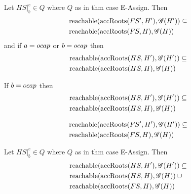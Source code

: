 \begin{proposition}
  Let $HS|_b^e \in Q$ where $Q$ as in thm case {\sc E-Assign}. Then
  \begin{align*}
    &\reachable{(\accRoots{(FS',H')}, \Graph{(H')})} \subseteq \\
    &\reachable{(\accRoots{(FS,H)}, \Graph{(H)})}
  \end{align*}
  and if $a = \ocap$ or $b = \ocap$ then
  \begin{align*}
    &\reachable{(\accRoots{(HS,H')}, \Graph{(H')})} \subseteq \\
    &\reachable{(\accRoots{(HS,H)}, \Graph{(H)})}
  \end{align*}
\end{proposition}

\begin{corollary}
  If $b = \ocap$ then 
  \begin{align*}
    &\reachable{(\accRoots{(HS,H')}, \Graph{(H')})} \subseteq \\
    &\reachable{(\accRoots{(HS,H)}, \Graph{(H)})}
  \end{align*}
\end{corollary}

\begin{corollary}
  \begin{align*}
    &\reachable{(\accRoots{(FS',H')}, \Graph{(H')})} \subseteq \\
    &\reachable{(\accRoots{(FS,H)}, \Graph{(H)})}
  \end{align*}
\end{corollary}

\begin{proposition}
  Let $HS|_b^e \in Q$ where $Q$ as in thm case {\sc E-Assign}. Then
  \begin{align*}
    &\reachable{(\accRoots{(HS,H')}, \Graph{(H')})} \subseteq \\
    &\reachable{(\accRoots{(HS,H)}, \Graph{(H)})}\: \cup \\ 
    &\reachable{(\accRoots{(FS,H)}, \Graph{(H)})}
  \end{align*}
\end{proposition}



